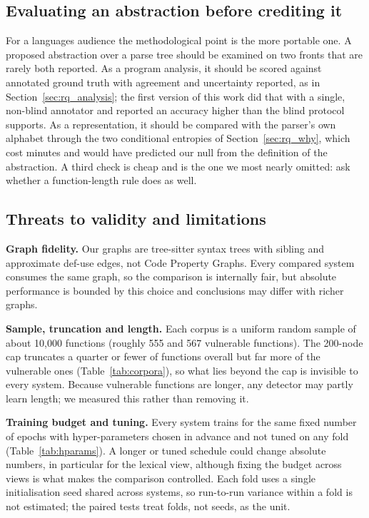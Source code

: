 \documentclass[pdflatex,sn-basic]{sn-jnl}
\theoremstyle{thmstyleone}%
\newcommand{\numbigvulVuln}{555}
\newcommand{\numdiversevulVuln}{567}
\begin{document}
\subsection{Evaluating an abstraction before crediting it}
For a languages audience the methodological point is the more portable one. A
proposed abstraction over a parse tree should be examined on two fronts that
are rarely both reported. As a program analysis, it should be scored against
annotated ground truth with agreement and uncertainty reported, as in
Section~\ref{sec:rq_analysis}; the first version of this work did that with a
single, non-blind annotator and reported an accuracy higher than the blind
protocol supports. As a representation, it should be compared with the parser's
own alphabet through the two conditional entropies of Section~\ref{sec:rq_why},
which cost minutes and would have predicted our null from the definition of the
abstraction. A third check is cheap and is the one we most nearly omitted: ask
whether a function-length rule does as well.

\subsection{Threats to validity and limitations}
\label{sec:limitations}

\textbf{Graph fidelity.} Our graphs are tree-sitter syntax trees with sibling and
approximate def-use edges, not Code Property Graphs. Every compared system
consumes the same graph, so the comparison is internally fair, but absolute
performance is bounded by this choice and conclusions may differ with richer
graphs.

\textbf{Sample, truncation and length.} Each corpus is a uniform random sample
of about 10{,}000 functions (roughly \numbigvulVuln{} and \numdiversevulVuln{}
vulnerable functions). The 200-node cap truncates a quarter or fewer of
functions overall but far more of the vulnerable ones (Table~\ref{tab:corpora}),
so what lies beyond the cap is invisible to every system. Because vulnerable
functions are longer, any detector may partly learn length; we measured this
rather than removing it.

\textbf{Training budget and tuning.} Every system trains for the same fixed
number of epochs with hyper-parameters chosen in advance and not tuned on any
fold (Table~\ref{tab:hparams}). A longer or tuned schedule could change absolute
numbers, in particular for the lexical view, although fixing the budget across
views is what makes the comparison controlled. Each fold uses a single
initialisation seed shared across systems, so run-to-run variance within a fold
is not estimated; the paired tests treat folds, not seeds, as the unit.
\end{document}
